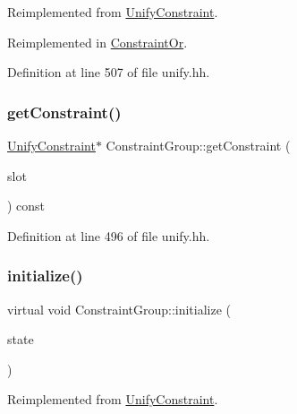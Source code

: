 Reimplemented from \mbox{\hyperlink{class_unify_constraint_a44f0164f38ac1fdc44fc73ebe7678de1}{Unify\+Constraint}}.



Reimplemented in \mbox{\hyperlink{class_constraint_or_a4ce164e19f57a285919eff135481dea9}{Constraint\+Or}}.



Definition at line 507 of file unify.\+hh.

\mbox{\label{class_constraint_group_ac29f72431489687d61ae3d7fa93e82f6}} 
\subsubsection{\texorpdfstring{getConstraint()}{getConstraint()}}
{\footnotesize\ttfamily \mbox{\hyperlink{class_unify_constraint}{Unify\+Constraint}}$\ast$ Constraint\+Group\+::get\+Constraint (\begin{DoxyParamCaption}\item[{int4}]{slot }\end{DoxyParamCaption}) const\hspace{0.3cm}{\ttfamily [inline]}}



Definition at line 496 of file unify.\+hh.

\mbox{\label{class_constraint_group_a96670ed925bd7fa0146f091baf31e3b2}} 
\subsubsection{\texorpdfstring{initialize()}{initialize()}}
{\footnotesize\ttfamily virtual void Constraint\+Group\+::initialize (\begin{DoxyParamCaption}\item[{\mbox{\hyperlink{class_unify_state}{Unify\+State}} \&}]{state }\end{DoxyParamCaption})\hspace{0.3cm}{\ttfamily [virtual]}}



Reimplemented from \mbox{\hyperlink{class_unify_constraint_ac812e2cf68c95e8a5c0e7e8ac02f2fc2}{Unify\+Constraint}}.



